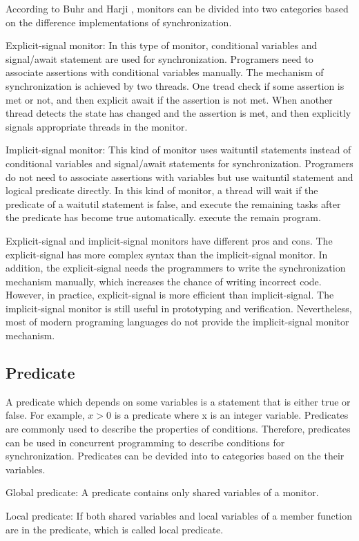 \documentclass[preprint]{sigplanconf}
\begin{document}
According to Buhr and Harji \cite{bh05}, monitors can be divided into two 
categories based on the difference implementations of synchronization. 
\begin{description}
  \item {Explicit-signal monitor:} In this type of monitor, conditional variables
    and signal/await statement are used for synchronization. Programers need to
    associate assertions with conditional variables manually. The mechanism of
    synchronization is achieved by two threads. One tread check if some
    assertion is met or not, and then explicit await if the assertion is not
    met. When another thread detects the state has changed and the assertion is
    met, and then explicitly signals appropriate threads in the monitor.
  \item {Implicit-signal monitor:} This kind of monitor uses waituntil
    statements instead of conditional variables and signal/await statements for
    synchronization. Programers do not need to associate assertions with
    variables but use waituntil statement and logical predicate directly. In
    this kind of monitor, a thread will wait if the predicate of a waitutil
    statement is false, and execute the remaining tasks after the predicate
    has become true automatically.
    execute the remain program. 
\end{description}


Explicit-signal and implicit-signal monitors have different pros and cons. The 
explicit-signal has more complex syntax than the implicit-signal monitor. In 
addition, the explicit-signal needs the programmers to write the synchronization
mechanism manually, which increases the chance of writing incorrect code. 
However, in practice, explicit-signal is more efficient than implicit-signal. 
The implicit-signal monitor is still useful in prototyping and verification. 
Nevertheless, most of modern programing languages do not provide the 
implicit-signal monitor mechanism.

\subsection{Predicate}
A predicate which depends on some variables is a statement that is either true
or false. For example, $x > 0$ is a predicate where x is an integer variable. 
Predicates are commonly used to describe the properties of conditions. 
Therefore, predicates can be used in concurrent programming to describe 
conditions for synchronization. Predicates can be devided into to categories
based on the their variables.
\begin{description}
  \item{Global predicate:} A predicate contains only shared variables of a
    monitor. 
  \item{Local predicate:} If both shared variables and local variables of a
    member function are in the predicate, which is called local predicate. 
\end{description}
\end{document}
